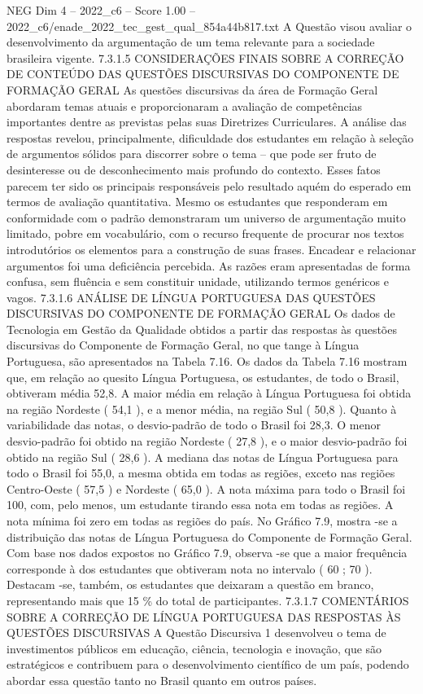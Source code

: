 \begin{textsample}{NEG Dim 4 – 2022\_c6 – Score 1.00 – 2022\_c6/enade\_2022\_tec\_gest\_qual\_854a44b817.txt}
A Questão visou avaliar o desenvolvimento da argumentação de um tema relevante para a sociedade brasileira vigente. 7.3.1.5 CONSIDERAÇÕES FINAIS SOBRE A CORREÇÃO DE CONTEÚDO DAS QUESTÕES DISCURSIVAS DO COMPONENTE DE FORMAÇÃO GERAL As questões discursivas da área de Formação Geral abordaram temas atuais e proporcionaram a avaliação de competências importantes dentre as previstas pelas suas Diretrizes Curriculares.
A análise das respostas revelou, principalmente, dificuldade dos estudantes em relação à seleção de argumentos sólidos para discorrer sobre o tema – que pode ser fruto de desinteresse ou de desconhecimento mais profundo do contexto.
Esses fatos parecem ter sido os principais responsáveis pelo resultado aquém do esperado em termos de avaliação quantitativa.
Mesmo os estudantes que responderam em conformidade com o padrão demonstraram um universo de argumentação muito limitado, pobre em vocabulário, com o recurso frequente de procurar nos textos introdutórios os elementos para a construção de suas frases.
Encadear e relacionar argumentos foi uma deficiência percebida.
As razões eram apresentadas de forma confusa, sem fluência e sem constituir unidade, utilizando termos genéricos e vagos. 7.3.1.6 ANÁLISE DE LÍNGUA PORTUGUESA DAS QUESTÕES DISCURSIVAS DO COMPONENTE DE FORMAÇÃO GERAL Os dados de Tecnologia em Gestão da Qualidade obtidos a partir das respostas às questões discursivas do Componente de Formação Geral, no que tange à Língua Portuguesa, são apresentados na Tabela 7.16.
Os dados da Tabela 7.16 mostram que, em relação ao quesito Língua Portuguesa, os estudantes, de todo o Brasil, obtiveram média 52,8.
A maior média em relação à Língua Portuguesa foi obtida na região Nordeste ( 54,1 ), e a menor média, na região Sul ( 50,8 ).
Quanto à variabilidade das notas, o desvio-padrão de todo o Brasil foi 28,3.
O menor desvio-padrão foi obtido na região Nordeste ( 27,8 ), e o maior desvio-padrão foi obtido na região Sul ( 28,6 ).
A mediana das notas de Língua Portuguesa para todo o Brasil foi 55,0, a mesma obtida em todas as regiões, exceto nas regiões Centro-Oeste ( 57,5 ) e Nordeste ( 65,0 ).
A nota máxima para todo o Brasil foi 100, com, pelo menos, um estudante tirando essa nota em todas as regiões.
A nota mínima foi zero em todas as regiões do país.
No Gráfico 7.9, mostra -se a distribuição das notas de Língua Portuguesa do Componente de Formação Geral.
Com base nos dados expostos no Gráfico 7.9, observa -se que a maior frequência corresponde à dos estudantes que obtiveram nota no intervalo ( 60 ; 70 ).
Destacam -se, também, os estudantes que deixaram a questão em branco, representando mais que 15 \% do total de participantes. 7.3.1.7 COMENTÁRIOS SOBRE A CORREÇÃO DE LÍNGUA PORTUGUESA DAS RESPOSTAS ÀS QUESTÕES DISCURSIVAS A Questão Discursiva 1 desenvolveu o tema de investimentos públicos em educação, ciência, tecnologia e inovação, que são estratégicos e contribuem para o desenvolvimento científico de um país, podendo abordar essa questão tanto no Brasil quanto em outros países.

\end{textsample}
